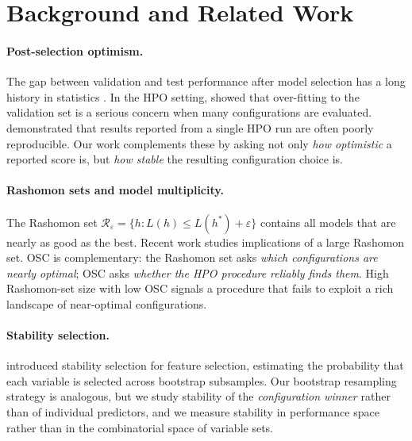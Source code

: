 \documentclass[twoside]{article}
\newcommand{\hstar}{h^*}
\begin{document}
\section{Background and Related Work}
\label{sec:related}

\paragraph{Post-selection optimism.}
The gap between validation and test performance after model selection has
a long history in statistics \citep{tibshirani2009prediction}. In the
HPO setting, \citet{cawley2010over} showed that over-fitting to the
validation set is a serious concern when many configurations are evaluated.
\citet{dodge2019show} demonstrated that results reported from a single
HPO run are often poorly reproducible. Our work complements these by
asking not only \emph{how optimistic} a reported score is, but \emph{how
stable} the resulting configuration choice is.

\paragraph{Rashomon sets and model multiplicity.}
The Rashomon set $\mathcal{R}_\varepsilon = \{h : L(h) \le L(\hstar)+\varepsilon\}$
\citep{breiman2001random} contains all models that are nearly as good as
the best. Recent work \citep{semenova2022existence, marx2020predictive,
d2022underspecification} studies implications of a large Rashomon set.
OSC is complementary: the Rashomon set asks \emph{which configurations
are nearly optimal}; OSC asks \emph{whether the HPO procedure reliably
finds them}. High Rashomon-set size with low OSC signals a procedure
that fails to exploit a rich landscape of near-optimal configurations.

\paragraph{Stability selection.}
\citet{meinshausen2010stability} introduced stability selection for
feature selection, estimating the probability that each variable is
selected across bootstrap subsamples. Our bootstrap resampling strategy
is analogous, but we study stability of the \emph{configuration winner}
rather than of individual predictors, and we measure stability in
performance space rather than in the combinatorial space of variable sets.
\end{document}
